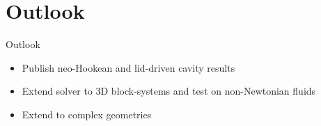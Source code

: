\section{Outlook}
\begin{frame}{Outlook}
    \begin{itemize}
        \item Publish neo-Hookean and lid-driven cavity results
        \item Extend solver to 3D block-systems and test on non-Newtonian fluids
        \item Extend to complex geometries
    \end{itemize}
\end{frame}

